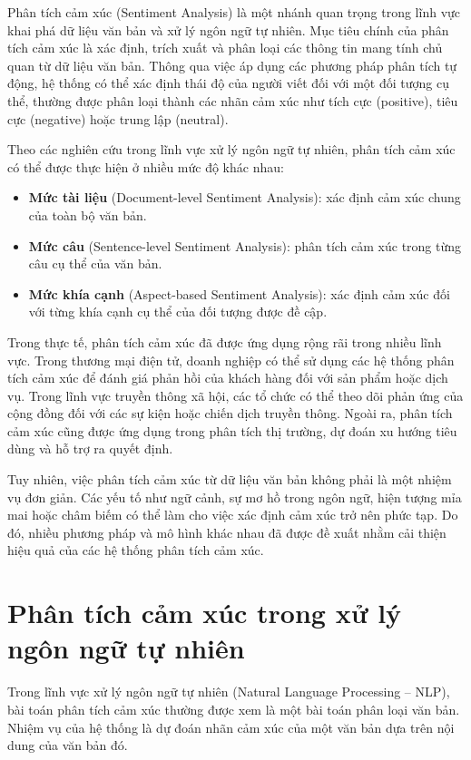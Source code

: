 \documentclass[14pt, a4paper]{report}
\begin{document}
Phân tích cảm xúc (Sentiment Analysis) là một nhánh quan trọng trong lĩnh vực khai phá dữ liệu văn bản và xử lý ngôn ngữ tự nhiên. Mục tiêu chính của phân tích cảm xúc là xác định, trích xuất và phân loại các thông tin mang tính chủ quan từ dữ liệu văn bản. Thông qua việc áp dụng các phương pháp phân tích tự động, hệ thống có thể xác định thái độ của người viết đối với một đối tượng cụ thể, thường được phân loại thành các nhãn cảm xúc như tích cực (positive), tiêu cực (negative) hoặc trung lập (neutral).

Theo các nghiên cứu trong lĩnh vực xử lý ngôn ngữ tự nhiên, phân tích cảm xúc có thể được thực hiện ở nhiều mức độ khác nhau:

\begin{itemize}
    \item \textbf{Mức tài liệu} (Document-level Sentiment Analysis): xác định cảm xúc chung của toàn bộ văn bản.
    \item \textbf{Mức câu} (Sentence-level Sentiment Analysis): phân tích cảm xúc trong từng câu cụ thể của văn bản.
    \item \textbf{Mức khía cạnh} (Aspect-based Sentiment Analysis): xác định cảm xúc đối với từng khía cạnh cụ thể của đối tượng được đề cập.
\end{itemize}

Trong thực tế, phân tích cảm xúc đã được ứng dụng rộng rãi trong nhiều lĩnh vực. Trong thương mại điện tử, doanh nghiệp có thể sử dụng các hệ thống phân tích cảm xúc để đánh giá phản hồi của khách hàng đối với sản phẩm hoặc dịch vụ. Trong lĩnh vực truyền thông xã hội, các tổ chức có thể theo dõi phản ứng của cộng đồng đối với các sự kiện hoặc chiến dịch truyền thông. Ngoài ra, phân tích cảm xúc cũng được ứng dụng trong phân tích thị trường, dự đoán xu hướng tiêu dùng và hỗ trợ ra quyết định.

Tuy nhiên, việc phân tích cảm xúc từ dữ liệu văn bản không phải là một nhiệm vụ đơn giản. Các yếu tố như ngữ cảnh, sự mơ hồ trong ngôn ngữ, hiện tượng mỉa mai hoặc châm biếm có thể làm cho việc xác định cảm xúc trở nên phức tạp. Do đó, nhiều phương pháp và mô hình khác nhau đã được đề xuất nhằm cải thiện hiệu quả của các hệ thống phân tích cảm xúc.

\section{Phân tích cảm xúc trong xử lý ngôn ngữ tự nhiên}

Trong lĩnh vực xử lý ngôn ngữ tự nhiên (Natural Language Processing -- NLP), bài toán phân tích cảm xúc thường được xem là một bài toán phân loại văn bản. Nhiệm vụ của hệ thống là dự đoán nhãn cảm xúc của một văn bản dựa trên nội dung của văn bản đó.
\end{document}
